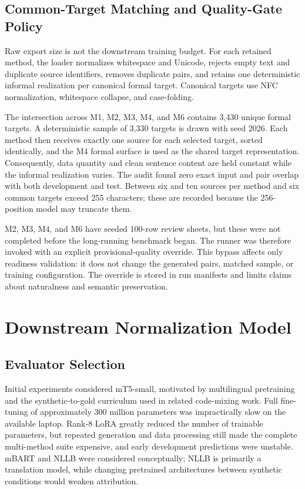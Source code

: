 \documentclass[12pt, a4paper, twoside, openany]{report}
\begin{document}
\subsection{Common-Target Matching and Quality-Gate Policy}

Raw export size is not the downstream training budget. For each retained method, the loader normalizes whitespace and Unicode, rejects empty text and duplicate source identifiers, removes duplicate pairs, and retains one deterministic informal realization per canonical formal target. Canonical targets use NFC normalization, whitespace collapse, and case-folding.

The intersection across M1, M2, M3, M4, and M6 contains 3,430 unique formal targets. A deterministic sample of 3,330 targets is drawn with seed 2026. Each method then receives exactly one source for each selected target, sorted identically, and the M4 formal surface is used as the shared target representation. Consequently, data quantity and clean sentence content are held constant while the informal realization varies. The audit found zero exact input and pair overlap with both development and test. Between six and ten sources per method and six common targets exceed 255 characters; these are recorded because the 256-position model may truncate them.

M2, M3, M4, and M6 have seeded 100-row review sheets, but these were not completed before the long-running benchmark began. The runner was therefore invoked with an explicit provisional-quality override. This bypass affects only readiness validation: it does not change the generated pairs, matched sample, or training configuration. The override is stored in run manifests and limits claims about naturalness and semantic preservation.


\section{Downstream Normalization Model}

\subsection{Evaluator Selection}

Initial experiments considered mT5-small, motivated by multilingual pretraining and the synthetic-to-gold curriculum used in related code-mixing work. Full fine-tuning of approximately 300 million parameters was impractically slow on the available laptop. Rank-8 LoRA greatly reduced the number of trainable parameters, but repeated generation and data processing still made the complete multi-method suite expensive, and early development predictions were unstable. mBART and NLLB were considered conceptually; NLLB is primarily a translation model, while changing pretrained architectures between synthetic conditions would weaken attribution.
\end{document}
